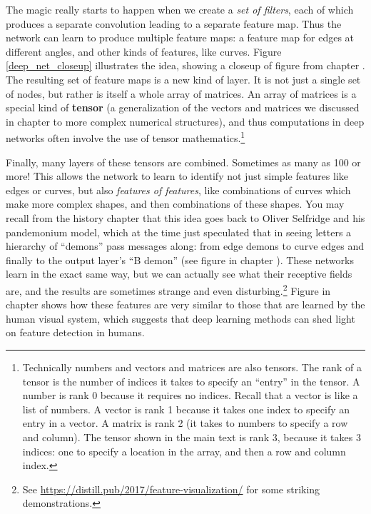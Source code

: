 The magic really starts to happen when we create a \emph{set of filters}, each of which produces a separate convolution leading to a separate feature map. Thus the network can learn to produce  multiple feature maps: a feature map for edges at different angles, and other kinds of features, like curves. Figure \ref{deep_net_closeup} illustrates the idea, showing a closeup of figure  from chapter . The resulting set of feature maps is a new kind of  layer. It is not just a  single set of nodes, but rather is itself a whole array of matrices. An array of matrices is a special kind of \textbf{tensor} (a generalization of the vectors and matrices we discussed in chapter  to more complex numerical structures), and thus computations in deep networks often involve the use of tensor mathematics.\footnote{Technically numbers and vectors and matrices are also tensors. The rank of a  tensor is the number of indices it takes to specify an ``entry'' in the tensor. A number is rank 0 because it requires no indices. Recall that a vector is like a list of numbers. A vector is rank 1 because it takes one index to specify an entry in a vector. A matrix is rank 2 (it takes to numbers to specify a row and column). The tensor shown in the main text is rank 3, because it takes 3 indices: one to specify a location in the array, and then a row and column index.}  

Finally, many layers of these tensors are combined. Sometimes as many as 100 or more! This allows the network to learn to identify not just simple features like edges or curves, but also \emph{features of features}, like combinations of curves which make more complex shapes, and then combinations of these shapes. You may recall from the history chapter that this idea goes  back to Oliver Selfridge and his pandemonium model, which at the time just speculated that in seeing letters a hierarchy of ``demons'' pass messages along: from edge demons to curve edges and finally to the output layer's ``B demon'' (see figure  in chapter ). These networks learn in the exact same way, but we can actually  see what their receptive fields are, and the results are sometimes strange and even disturbing.\footnote{See \url{https://distill.pub/2017/feature-visualization/} for some striking demonstrations.} Figure  in chapter  shows how these features are very similar to those that are learned by the human visual system, which suggests that deep learning methods can shed light on feature detection in humans.

